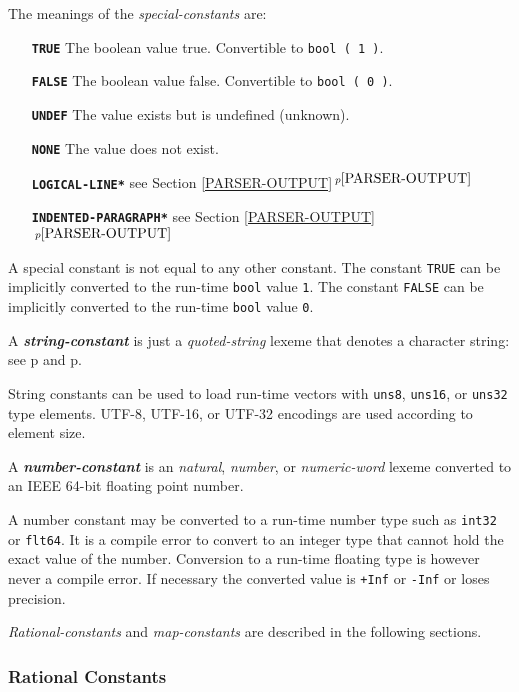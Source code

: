 \documentclass[12pt]{article}
\newcommand{\TT}[1]{{\tt \bfseries #1}}
\newcommand{\emkey}[1]{{\em \bfseries #1}}
\newcommand{\itemref}[1]{\ref{#1}$\,^{p\pageref{#1}}$}
\newcommand{\pagref}[1]{p\pageref{#1}}
\newenvironment{indpar}[1][0.3in]%
	{\begin{list}{}%
		     {\setlength{\itemsep}{0in}%
		      \setlength{\topsep}{0in}%
		      \setlength{\parsep}{1ex}%
		      \setlength{\labelwidth}{#1}%
		      \setlength{\leftmargin}{#1}%
		      \addtolength{\leftmargin}{\labelsep}}%
	 \item}%
	{\end{list}}
\begin{document}
The meanings of the {\em special-constants} are:
\begin{indpar}[1.6in]
\begin{itemize}
\item[\TT{TRUE}] The boolean value true.  Convertible to {\tt bool ( 1 )}.
\item[\TT{FALSE}] The boolean value false.  Convertible to {\tt bool ( 0 )}.
\item[\TT{UNDEF}] The value exists but is undefined (unknown).
\item[\TT{NONE}] The value does not exist.
\item[\TT{*LOGICAL-LINE*}] see Section \itemref{PARSER-OUTPUT}
\item[\TT{*INDENTED-PARAGRAPH*}] see Section \itemref{PARSER-OUTPUT}
\end{itemize}
\end{indpar}
A special constant is not equal to any other constant.
The constant {\tt TRUE} can be implicitly converted to the
run-time {\tt bool} value {\tt 1}.
The constant {\tt FALSE} can be implicitly converted to the
run-time {\tt bool} value {\tt 0}.

A \emkey{string-constant} is just a {\em quoted-string} lexeme
that denotes a character string: see
\pagref{QUOTED-STRING} and \pagref{QUOTED-STRING-CONCATENATION}.

String constants can be used to load run-time vectors
with {\tt uns8}, {\tt uns16}, or {\tt uns32} type elements.
UTF-8, UTF-16, or UTF-32 encodings are used according to element
size.

A \emkey{number-constant}\label{NUMBER-CONSTANT}
is an {\em natural}, {\em number},
or {\em numeric-word} lexeme converted to an IEEE 64-bit floating
point number.

A number constant may be converted to a run-time
number type such as {\tt int32} or {\tt flt64}.
It is a compile error to convert to an integer type that cannot
hold the exact value of the number.
Conversion to a run-time floating type is however
never a compile error.  If necessary the converted value is
{\tt +Inf} or {\tt -Inf} or loses precision.

{\em Rational-constants} and {\em map-constants} are described in the
following sections.


\subsubsection{Rational Constants}
\label{RATIONAL-CONSTANTS}
\end{document}
